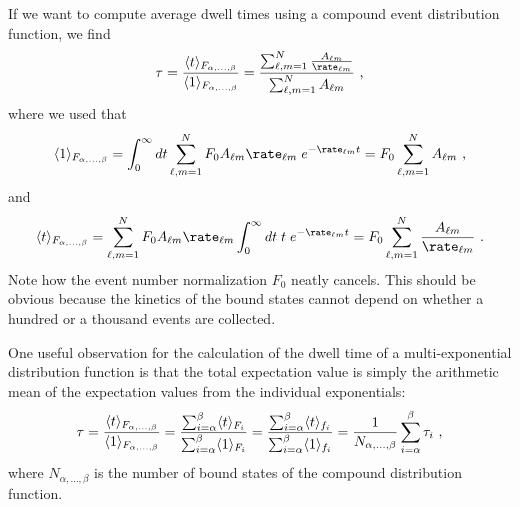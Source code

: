 If we want to compute average dwell times using a compound event distribution function, we find
%
\begin{align}\label{eq:exp_dwell_time}
    \tau = \frac{\langle t \rangle_{F_{\alpha,\dots,\beta}}}{%
                 \langle 1 \rangle_{F_{\alpha,\dots,\beta}}}
    = \frac{\sum_{\ell, m=1}^N \frac{A_{\ell m} }{\rate_{\ell m}}}{%
        \sum_{\ell, m=1}^N A_{\ell m}}
    \text{ ,}
\end{align}
%
where we used that
%
\begin{align*}
    \langle 1 \rangle_{F_{\alpha,\dots,\beta}}
    =  \int_0^\infty dt \sum_{\ell, m=1}^N
        F_{0} A_{\ell m} \rate_{\ell m}\;e^{-\rate_{\ell m} t}
    = F_{0}\sum_{\ell, m=1}^N A_{\ell m}
    \text{ ,}
\end{align*}
%
and
%
\begin{align*}
    \langle t \rangle_{F_{\alpha,\dots,\beta}}
    =  \sum_{\ell, m=1}^N
        F_{0} A_{\ell m} \rate_{\ell m}\int_0^\infty dt\;  t\;e^{-\rate_{\ell m} t}
    =  F_{0}\sum_{\ell, m=1}^N \frac{A_{\ell m}}{\rate_{\ell m}}
    \text{ .}
\end{align*}
%
Note how the event number normalization $F_0$ neatly cancels. This should be obvious because the kinetics of
the bound states cannot depend on whether a hundred or a thousand events are collected.

One useful observation for the calculation of the dwell time of a multi-exponential distribution function is
that the total expectation value is simply the arithmetic mean of the expectation values from the individual
exponentials:
%
\begin{align}\label{eq:tau_arithmetic_mean}
    \tau = \frac{\langle t \rangle_{F_{\alpha,\dots,\beta}}}{%
                 \langle 1 \rangle_{F_{\alpha,\dots,\beta}}}
    = \frac{\sum_{i=\alpha}^{\beta}\langle t \rangle_{F_i}}{%
            \sum_{i=\alpha}^{\beta}\langle 1 \rangle_{F_i}}
    = \frac{\sum_{i=\alpha}^{\beta}\langle t \rangle_{f_i}}{%
            \sum_{i=\alpha}^{\beta}\langle 1 \rangle_{f_i}}
    = \frac{1}{N_{\alpha,\ldots,\beta}}\sum_{i=\alpha}^{\beta}\tau_i
    \text{ ,}
\end{align}
%
where $N_{\alpha,\ldots,\beta}$ is the number of bound states of the compound distribution function.

